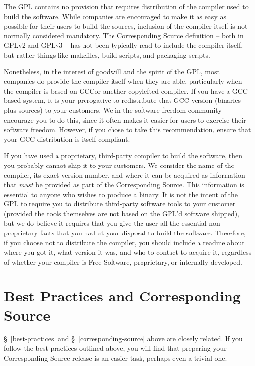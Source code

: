 The GPL contains no provision that requires distribution of the compiler
used to build the software.  While companies are encouraged to make it as
easy as possible for their users to build the sources, inclusion of the
compiler itself is not normally considered mandatory.  The Corresponding
Source definition -- both in GPLv2 and GPLv3 -- has not been typically
read to include the compiler itself, but rather things like makefiles,
build scripts, and packaging scripts.

Nonetheless, in the interest of goodwill and the spirit of the GPL, most
companies do provide the compiler itself when they are able, particularly
when the compiler is based on GCC\@ or another copylefted compiler.  If you have
a GCC-based system, it is your prerogative to redistribute that GCC
version (binaries plus sources) to your customers.  We in the software freedom
community encourage you to do this, since it often makes it easier for
users to exercise their software freedom.  However, if you chose to take
this recommendation, ensure that your GCC distribution is itself
compliant.

If you have used a proprietary, third-party compiler to build the
software, then you probably cannot ship it to your customers.  We consider
the name of the compiler, its exact version number, and where it can be
acquired as information that \emph{must} be provided as part of the
Corresponding Source.  This information is essential to anyone who wishes
to produce a binary.  It is not the intent of the GPL to require you to
distribute third-party software tools to your customer (provided the tools
themselves are not based on the GPL'd software shipped), but we do believe
it requires that you give the user all the essential non-proprietary facts
that you had at your disposal to build the software.  Therefore, if you
choose not to distribute the compiler, you should include a {\sc readme}
about where you got it, what version it was, and who to contact to acquire
it, regardless of whether your compiler is Free Software, proprietary, or
internally developed.

\section{Best Practices and Corresponding Source}

\S~\ref{best-practices} and \S~\ref{corresponding-source} above are
closely related.  If you follow the best practices outlined above, you
will find that preparing your Corresponding Source release is an easier
task, perhaps even a trivial one.

